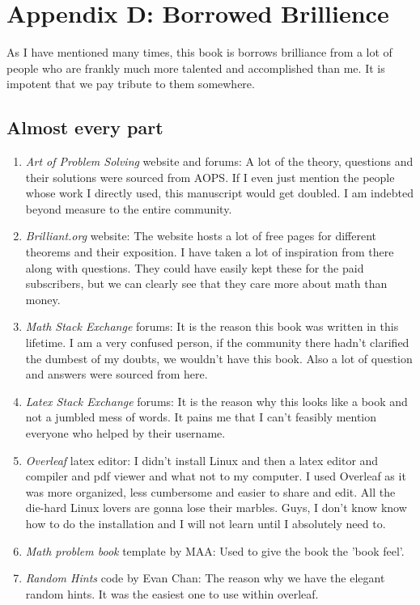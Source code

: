 \chapter{Appendix D: Borrowed Brillience}
As I have mentioned many times, this book is  borrows brilliance from a lot of people who are frankly much more talented and accomplished than me. It is impotent that we pay tribute to them somewhere.
\section{Almost every part}
\begin{enumerate}
    \item \emph{Art of Problem Solving} website and forums: A lot of the theory, questions and their solutions were sourced from AOPS. If I even just mention the people whose work I directly used, this manuscript would get doubled. I am indebted beyond measure to the entire community.
    \item \emph{Brilliant.org} website: The website hosts a lot of free pages for different theorems and their exposition. I have taken a lot of inspiration from there along with questions. They could have easily kept these for the paid subscribers, but we can clearly see that they care more about math than money.
    \item \emph{Math Stack Exchange} forums: It is the reason this book was written in this lifetime. I am a very confused person, if the community there hadn't clarified the dumbest of my doubts, we wouldn't have this book. Also a lot of question and answers were sourced from here.
    \item \emph{Latex Stack Exchange} forums: It is the reason why this looks like a book and not a jumbled mess of words. It pains me that I can't feasibly mention everyone who helped by their username.
    \item \emph{Overleaf} latex editor: I didn't install Linux and then a latex editor and compiler and pdf viewer and what not to my computer. I used Overleaf as it was more organized, less cumbersome and easier to share and edit. All the die-hard Linux lovers are gonna lose their marbles. Guys, I don't know know how to do the installation and I will not learn until I absolutely need to.
    \item \emph{Math problem book} template by MAA: Used to give the book the 'book feel'.
    \item \emph{Random Hints} code by Evan Chan: The reason why we have the elegant random hints. It was the easiest one to use within overleaf.
\end{enumerate}
